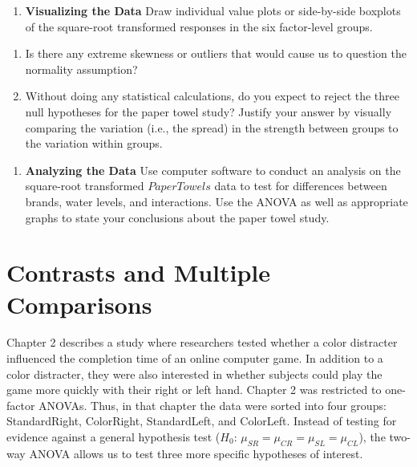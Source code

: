 \documentclass[
]{report}
\providecommand{\tightlist}{%
  \setlength{\itemsep}{0pt}\setlength{\parskip}{0pt}}
\begin{document}
\begin{enumerate}
\def\labelenumi{\arabic{enumi}.}
\setcounter{enumi}{34}
\tightlist
\item
  \textbf{Visualizing the Data} Draw individual value plots or side-by-side boxplots of the square-root transformed responses in the six factor-level groups.
\end{enumerate}

\begin{enumerate}
\def\labelenumi{\alph{enumi}.}
\tightlist
\item
  Is there any extreme skewness or outliers that would cause us to question the normality assumption?
\item
  Without doing any statistical calculations, do you expect to reject the three null hypotheses for the paper towel study? Justify your answer by visually comparing the variation (i.e., the spread) in the strength between groups to the variation within groups.
\end{enumerate}

\begin{enumerate}
\def\labelenumi{\arabic{enumi}.}
\setcounter{enumi}{35}
\tightlist
\item
  \textbf{Analyzing the Data} Use computer software to conduct an analysis on the square-root transformed \(PaperTowels\) data to test for differences between brands, water levels, and interactions. Use the ANOVA as well as appropriate graphs to state your conclusions about the paper towel study.
\end{enumerate}

\hypertarget{contrasts-and-multiple-comparisons}{%
\section{\texorpdfstring{\textbf{Contrasts and Multiple Comparisons}}{Contrasts and Multiple Comparisons}}\label{contrasts-and-multiple-comparisons}}

Chapter 2 describes a study where researchers tested whether a color distracter influenced the completion time of an online computer game. In addition to a color distracter, they were also interested in whether subjects could play the game more quickly with their right or left hand. Chapter 2 was restricted to one-factor ANOVAs. Thus, in that chapter the data were sorted into four groups: StandardRight, ColorRight, StandardLeft, and ColorLeft. Instead of testing for evidence against a general hypothesis test (\(H_0\): \(\mu_{SR} = \mu_{CR} = \mu_{SL} = \mu_{CL}\)), the two-way ANOVA allows us to test three more specific hypotheses of interest.
\end{document}
